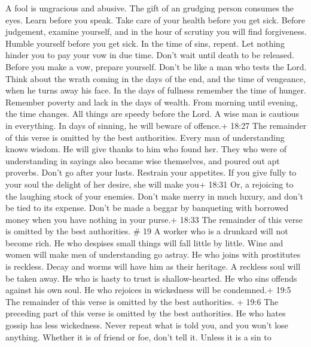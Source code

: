 A fool is ungracious and abusive. The gift of an grudging person
consumes the eyes.  Learn before you speak. Take care of
your health before you get sick.  Before judgement, examine
yourself, and in the hour of scrutiny you will find forgiveness.
 Humble yourself before you get sick. In the time of sins,
repent.  Let nothing hinder you to pay your vow in due
time. Don't wait until death to be released.  Before you
make a vow, prepare yourself. Don't be like a man who tests the Lord.
 Think about the wrath coming in the days of the end, and
the time of vengeance, when he turns away his face.  In the
days of fullness remember the time of hunger. Remember poverty and lack
in the days of wealth.  From morning until evening, the
time changes. All things are speedy before the Lord.  A
wise man is cautious in everything. In days of sinning, he will beware
of offence.+ 18:27 The remainder of this verse is omitted by the best
authorities.  Every man of understanding knows wisdom. He
will give thanks to him who found her.  They who were of
understanding in sayings also became wise themselves, and poured out apt
proverbs.  Don't go after your lusts. Restrain your
appetites.  If you give fully to your soul the delight of
her desire, she will make you+ 18:31 Or, a rejoicing to the laughing
stock of your enemies.  Don't make merry in much luxury,
and don't be tied to its expense.  Don't be made a beggar
by banqueting with borrowed money when you have nothing in your purse.+
18:33 The remainder of this verse is omitted by the best authorities. \#
19  A worker who is a drunkard will not become rich. He who
despises small things will fall little by little.  Wine and
women will make men of understanding go astray. He who joins with
prostitutes is reckless.  Decay and worms will have him as
their heritage. A reckless soul will be taken away.  He who
is hasty to trust is shallow-hearted. He who sins offends against his
own soul.  He who rejoices in wickedness will be condemned.+
19:5 The remainder of this verse is omitted by the best authorities.
 + 19:6 The preceding part of this verse is omitted by the
best authorities. He who hates gossip has less wickedness. 
Never repeat what is told you, and you won't lose anything. 
Whether it is of friend or foe, don't tell it. Unless it is a sin to
